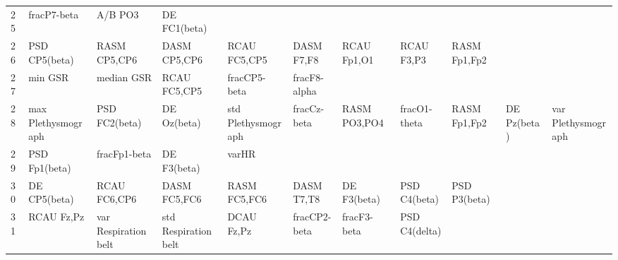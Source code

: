 \begin{landscape}
\begin{table}[]
\begin{tabular}{l|llllllll}
25       & fracP7-beta           & A/B PO3               & DE FC1(beta)         &                         &                         &                      &                      &                       &                       &                    \\
26       & PSD CP5(beta)         & RASM CP5,CP6          & DASM CP5,CP6         & RCAU FC5,CP5            & DASM F7,F8              & RCAU Fp1,O1          & RCAU F3,P3           & RASM Fp1,Fp2          &                       &                    \\
27       & min GSR               & median GSR            & RCAU FC5,CP5         & fracCP5-beta            & fracF8-alpha            &                      &                      &                       &                       &                    \\
28       & max Plethysmograph    & PSD FC2(beta)         & DE Oz(beta)          & std Plethysmograph      & fracCz-beta             & RASM PO3,PO4         & fracO1-theta         & RASM Fp1,Fp2          & DE Pz(beta)           & var Plethysmograph \\
29       & PSD Fp1(beta)         & fracFp1-beta          & DE F3(beta)          & varHR                   &                         &                      &                      &                       &                       &                    \\
30       & DE CP5(beta)          & RCAU FC6,CP6          & DASM FC5,FC6         & RASM FC5,FC6            & DASM T7,T8              & DE F3(beta)          & PSD C4(beta)         & PSD P3(beta)          &                       &                    \\
31       & RCAU Fz,Pz            & var Respiration belt  & std Respiration belt & DCAU Fz,Pz              & fracCP2-beta            & fracF3-beta          & PSD C4(delta)        &                       &                       &                    \\             
\end{tabular}
\end{table}
\end{landscape}